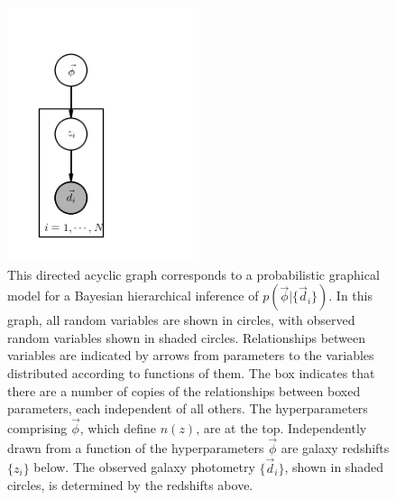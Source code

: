 \documentclass[iop]{emulateapj}
\begin{document}
\begin{figure}
	\begin{center}
		\includegraphics[width=0.5\textwidth]{pgm.png}
		\caption{This directed acyclic graph corresponds to a probabilistic graphical model for a Bayesian hierarchical inference of $p(\vec{\phi}|\{\vec{d}_{i}\})$.  In this graph, all random variables are shown in circles, with observed random variables shown in shaded circles.  Relationships between variables are indicated by arrows from parameters to the variables distributed according to functions of them.  The box indicates that there are a number of copies of the relationships between boxed parameters, each independent of all others.  The hyperparameters comprising $\vec{\phi}$, which define $n(z)$, are at the top.  Independently drawn from a function of the hyperparameters $\vec{\phi}$ are galaxy redshifts $\{z_{i}\}$ below.  The observed galaxy photometry $\{\vec{d}_{i}\}$, shown in shaded circles, is determined by the redshifts above.}
	\label{fig:pgm}
	\end{center}
\end{figure}

\end{document}
